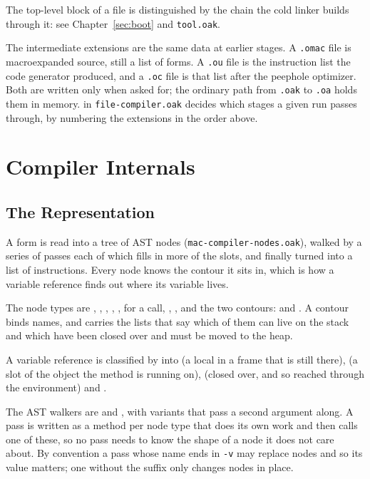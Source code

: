 The top-level block of a file is distinguished by the chain the cold
linker builds through it: see Chapter~\ref{sec:boot} and
\texttt{tool.oak}.

The intermediate extensions are the same data at earlier stages.
A \texttt{.omac} file is macroexpanded source, still a list of forms.
A \texttt{.ou} file is the instruction list the code generator
produced, and a \texttt{.oc} file is that list after the peephole
optimizer.  Both are written only when asked for; the ordinary path
from \texttt{.oak} to \texttt{.oa} holds them in memory.
 in \texttt{file-compiler.oak} decides which
stages a given run passes through, by numbering the extensions in
the order above.

\section{Compiler Internals}

\subsection{The Representation}

A form is read into a tree of AST nodes (\texttt{mac-compiler-nodes.oak}),
walked by a series of passes each of which fills in more of the slots,
and finally turned into a list of instructions.  Every node knows
the contour it sits in, which is how a variable reference finds out
where its variable lives.

The node types are , ,
, , ,
 for a call, ,
, and the two contours:  and
.  A contour binds names, and carries the lists
that say which of them can live on the stack and which have been
closed over and must be moved to the heap.

A variable reference is classified by  into
 (a local in a frame that is still there),  (a
slot of the object the method is running on),  (closed
over, and so reached through the environment) and .

The AST walkers are  and , with
 variants that pass a second argument along.  A pass is
written as a method per node type that does its own work and then
calls one of these, so no pass needs to know the shape of a node it
does not care about.  By convention a pass whose name ends in
\texttt{-v} may replace nodes and so its value matters; one without
the suffix only changes nodes in place.

